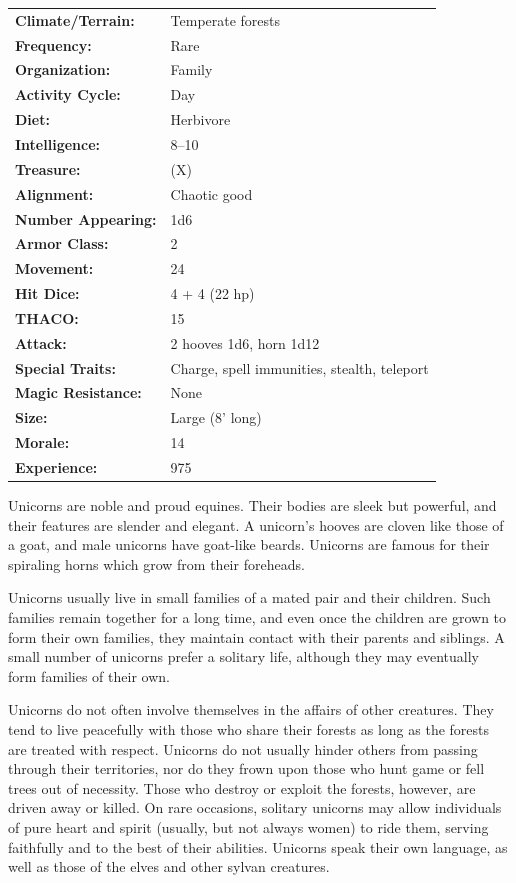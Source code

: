 \begin{multicols}{2}
\begin{minipage}{\columnwidth}
\noindent \begin{tabular}{p{}p{}}
\textbf{Climate/Terrain:}	& Temperate forests	\\
\textbf{Frequency:} 		& Rare	\\
\textbf{Organization:} 		& Family	\\
\textbf{Activity Cycle:} 	& Day	\\
\textbf{Diet:} 				& Herbivore	\\
\textbf{Intelligence:} 		& 8--10	\\
\textbf{Treasure:} 			& (X)	\\
\textbf{Alignment:} 		& Chaotic good	\\
\hline
\textbf{Number Appearing:} 	& 1d6	\\
\textbf{Armor Class:} 		& 2	\\
\textbf{Movement:} 			& 24	\\
\textbf{Hit Dice:} 			& 4 + 4 (22 hp)	\\
\textbf{THACO:} 			& 15	\\
\textbf{Attack:} 			& 2 hooves 1d6, horn 1d12	\\
\textbf{Special Traits:} & Charge, spell immunities, stealth, teleport	\\
\textbf{Magic Resistance:} 	& None	\\
\textbf{Size:} 				& Large (8' long)	\\
\textbf{Morale:} 			& 14	\\
\textbf{Experience:} 		& 975	\\ %
\end{tabular}

\end{minipage}

Unicorns are noble and proud equines. Their bodies are sleek but powerful, and their features are slender and elegant. A unicorn's hooves are cloven like those of a goat, and male unicorns have goat-like beards. Unicorns are famous for their spiraling horns which grow from their foreheads.

Unicorns usually live in small families of a mated pair and their children. Such families remain together for a long time, and even once the children are grown to form their own families, they maintain contact with their parents and siblings. A small number of unicorns prefer a solitary life, although they may eventually form families of their own.

Unicorns do not often involve themselves in the affairs of other creatures. They tend to live peacefully with those who share their forests as long as the forests are treated with respect. Unicorns do not usually hinder others from passing through their territories, nor do they frown upon those who hunt game or fell trees out of necessity. Those who destroy or exploit the forests, however, are driven away or killed. On rare occasions, solitary unicorns may allow individuals of pure heart and spirit (usually, but not always women) to ride them, serving faithfully and to the best of their abilities. Unicorns speak their own language, as well as those of the elves and other sylvan creatures.


\end{multicols}
